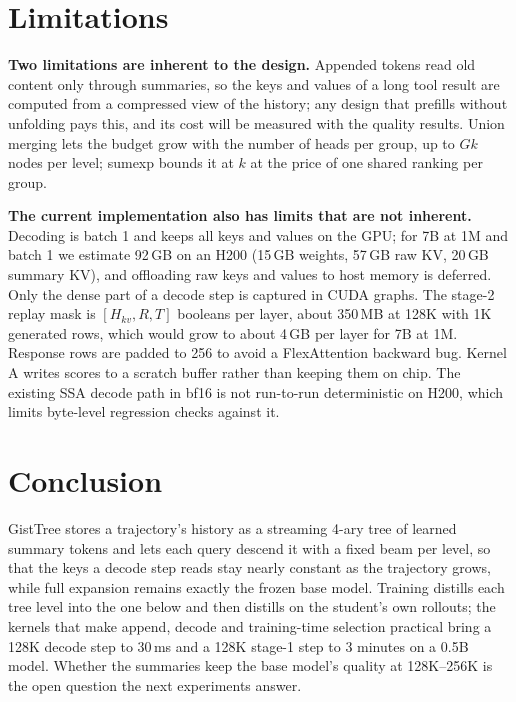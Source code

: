 \documentclass[10pt,twocolumn]{article}
\newcommand{\ours}{GistTree\xspace}
\newcommand{\para}[1]{\noindent\textbf{#1}\hspace{0.5em}}
\begin{document}
\section{Limitations}

\para{Two limitations are inherent to the design.}
Appended tokens read old content only through summaries, so the keys and values of a long
tool result are computed from a compressed view of the history; any design that prefills
without unfolding pays this, and its cost will be measured with the quality results. Union
merging lets the budget grow with the number of heads per group, up to $Gk$ nodes per level;
sumexp bounds it at $k$ at the price of one shared ranking per group.

\para{The current implementation also has limits that are not inherent.}
Decoding is batch 1 and keeps all keys and values on the GPU; for 7B at 1M and batch 1 we
estimate 92\,GB on an H200 (15\,GB weights, 57\,GB raw KV, 20\,GB summary KV), and offloading raw
keys and values to host memory is deferred. Only the dense part of a decode step is captured in
CUDA graphs. The stage-2 replay mask is $[H_{kv},R,T]$ booleans per layer, about 350\,MB at 128K
with 1K generated rows, which would grow to about 4\,GB per layer for 7B at 1M. Response rows are
padded to 256 to avoid a FlexAttention backward bug. Kernel A writes scores to a scratch buffer
rather than keeping them on chip. The existing SSA decode path in bf16 is not run-to-run
deterministic on H200, which limits byte-level regression checks against it.

\section{Conclusion}

\ours stores a trajectory's history as a streaming 4-ary tree of learned summary tokens and
lets each query descend it with a fixed beam per level, so that the keys a decode step reads
stay nearly constant as the trajectory grows, while full expansion remains exactly the frozen
base model. Training distills each tree level into the one below and then distills on the
student's own rollouts; the kernels that make append, decode and training-time selection
practical bring a 128K decode step to 30\,ms and a 128K stage-1 step to 3 minutes on a 0.5B
model. Whether the summaries keep the base model's quality at 128K--256K is the open question
the next experiments answer.



\end{document}
